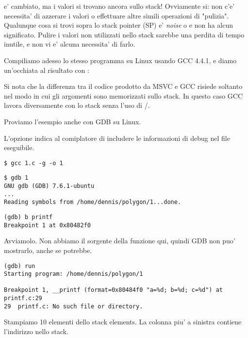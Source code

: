 \ESP e' cambiato, ma i valori si trovano ancora sullo stack!
Ovviamente si: non c'e' necessita' di azzerare i valori o effettuare altre simili operazioni di "pulizia".
Qualunque cosa si trovi sopra lo stack pointer (\ac{SP}) e' \emph{noise} o \emph{\garbage{}} e non ha alcun significato.
Pulire i valori non utilizzati nello stack sarebbe una perdita di tempo inutile, e non vi e' alcuna necessita' di farlo.


Compiliamo adesso lo stesso programma su Linux usando GCC 4.4.1, e diamo un'occhiata al risultato con \IDA:



Si nota che la differenza tra il codice prodotto da MSVC e GCC risiede soltanto nel modo in cui gli argomenti sono memorizzati sullo stack.
In questo caso GCC lavora diversamente con lo stack senza l'uso di \PUSH/\POP.


Proviamo l'esempio anche con \ac{GDB} su Linux.

L'opzione  indica al comiplatore di includere le informazioni di debug nel file eseguibile.

\begin{lstlisting}
$ gcc 1.c -g -o 1
\end{lstlisting}

\begin{lstlisting}
$ gdb 1
GNU gdb (GDB) 7.6.1-ubuntu
...
Reading symbols from /home/dennis/polygon/1...done.
\end{lstlisting}

\begin{lstlisting}[caption=impostiamo un breakpoint su \printf]
(gdb) b printf
Breakpoint 1 at 0x80482f0
\end{lstlisting}

Avviamolo.
Non abbiamo il sorgente della funzione \printf qui, quindi \ac{GDB} non puo' mostrarlo, anche se potrebbe.

\begin{lstlisting}
(gdb) run
Starting program: /home/dennis/polygon/1 

Breakpoint 1, __printf (format=0x80484f0 "a=%d; b=%d; c=%d") at printf.c:29
29	printf.c: No such file or directory.
\end{lstlisting}

Stampiamo 10 elementi dello stack elements. La colonna piu' a sinistra contiene l'indirizzo nello stack.

